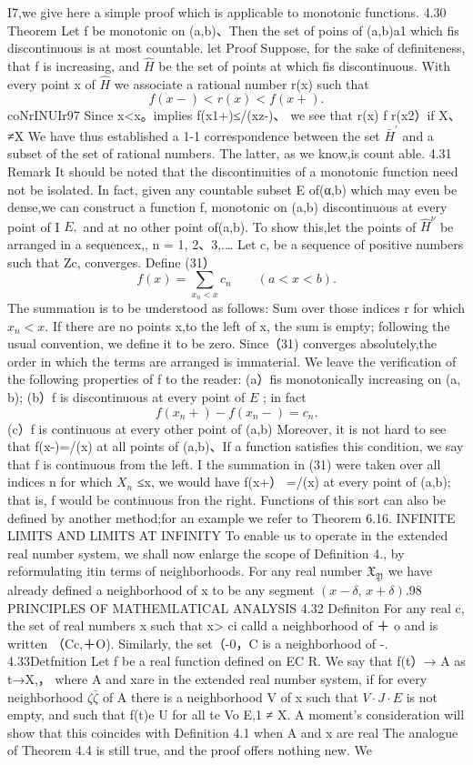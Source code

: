 I7,we give here a simple proof which is applicable to monotonic functions. 4.30 Theorem Let f be monotonic on (a,b)、Then the set of poins of (a,b)a1 which fis discontinuous is at most countable. let Proof Suppose, for the sake of definiteness, that f is increasing, and $\widehat{H}$ be the set of points at which fis discontinuous. With every point x of $\widehat{H}$ we associate a rational number r(x) such that $$ f(x-)<r(x)<f(x+). $$coNrINUIr97 Since x<x。implies f(x1+)≤/(xz-)、 we see that r(x) f r(x2）if X、≠X We have thus established a 1-1 correspondence between the set $\textstyle{\bar{H}}^{\prime}$ and a subset of the set of rational numbers. The latter, as we know,is count able. 4.31 Remark It should be noted that the discontinuities of a monotonic function need not be isolated. In fact, given any countable subset E of(α,b) which may even be dense,we can construct a function f, monotonic on (a,b) discontinuous at every point of I $\textstyle E,$ and at no other point of(a,b). To show this,let the points of $\textstyle{\hat{H}}^{\nu}$ be arranged in a sequence{x,}, n = 1, 2、3,.… Let {c,} be a sequence of positive numbers such that Zc, converges. Define (31） $$ f(x)=\sum_{x_{n}<x}c_{n}\qquad(a<x<b). $$ The summation is to be understood as follows: Sum over those indices r for which $x_{n}<x.$ If there are no points x,to the left of x, the sum is empty; following the usual convention, we define it to be zero. Since（31) converges absolutely,the order in which the terms are arranged is immaterial. We leave the verification of the following properties of f to the reader: (a）fis monotonically increasing on (a, b); (b）f is discontinuous at every point of $\textstyle E$ ; in fact $$ f(x_{n}+)-f(x_{n}-)=c_{n}. $$ (c）f is continuous at every other point of (a,b) Moreover, it is not hard to see that f(x-)=/(x) at all points of (a,b)、If a function satisfies this condition, we say that f is continuous from the left. I the summation in (31) were taken over all indices n for which $X_{n}$ ≤x, we would have f(x+） =/(x) at every point of (a,b); that is, f would be continuous fron the right. Functions of this sort can also be defined by another method;for an example we refer to Theorem 6.16. INFINITE LIMITS AND LIMITS AT INFINITY To enable us to operate in the extended real number system, we shall now enlarge the scope of Definition 4., by reformulating itin terms of neighborhoods. For any real number ${\mathfrak{X}}_{\mathfrak{Y}}$ we have already defined a neighborhood of x to be any segment $(x-\delta,\,x+\delta).$98 PRINCIPLES OF MATHEMLATICAL ANALYSIS 4.32 Definiton For any real c, the set of real numbers x such that x> ci calld a neighborhood of ＋ o and is written （Cc,＋O). Similarly, the set（-0，C is a neighborhood of -. 4.33Detfnition Let f be a real function defined on EC R. We say that f(t）→ A as t→X,， where A and xare in the extended real number system, if for every neighborhood $\textstyle\zeta\bar{\zeta}$ of A there is a neighborhood V of x such that $\scriptstyle V\cdot J\cdot E$ is not empty, and such that f(t)e U for all te Vo E,1 ≠ X. A moment's consideration will show that this coincides with Definition 4.1 when A and x are real The analogue of Theorem 4.4 is still true, and the proof offers nothing new. We 